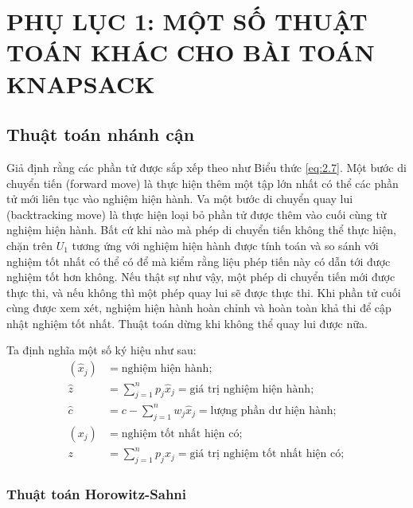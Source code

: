 \appendix

\chapter*{PHỤ LỤC 1: MỘT SỐ THUẬT TOÁN KHÁC CHO BÀI TOÁN KNAPSACK}

\section{Thuật toán nhánh cận}

Giả định rằng các phần tử được sắp xếp theo như Biểu thức \eqref{eq:2.7}. Một bước di chuyển tiến (forward move) là thực hiện thêm một tập lớn nhất có thể các phần tử mới liên tục vào nghiệm hiện hành. Va một bước di chuyển quay lui (backtracking move) là thực hiện loại bỏ phần tử được thêm vào cuối cùng từ nghiệm hiện hành. Bất cứ khi nào mà phép di chuyển tiến không thể thực hiện, chặn trên $U_1$ tương ứng với nghiệm hiện hành được tính toán và so sánh với nghiệm tốt nhất có thể có để mà kiểm rằng liệu phép tiến này có dẫn tới được nghiệm tốt hơn không. Nếu thật sự như vậy, một phép di chuyển tiến mới được thực thi, và nếu không thì một phép quay lui sẽ được thực thi. Khi phần tử cuối cùng được xem xét, nghiệm hiện hành hoàn chỉnh và hoàn toàn khả thi để cập nhật nghiệm tốt nhất. Thuật toán dừng khi không thể quay lui được nữa.

Ta định nghĩa một số ký hiệu như sau:
\begin{align*}
    (\hat{x}_j) &= \text{nghiệm hiện hành};\\
    \hat{z} &= \sum_{j=1}^np_j\hat{x}_j =\text{giá trị nghiệm hiện hành};\\
    \hat{c} &= c - \sum_{j=1}^nw_j\hat{x}_j =\text{lượng phần dư hiện hành};\\
    (x_j) &= \text{nghiệm tốt nhất hiện có};\\
    z &=\sum_{j=1}^np_j{x}_j =\text{giá trị nghiệm tốt nhất hiện có};
\end{align*}

\subsection{Thuật toán Horowitz-Sahni}

